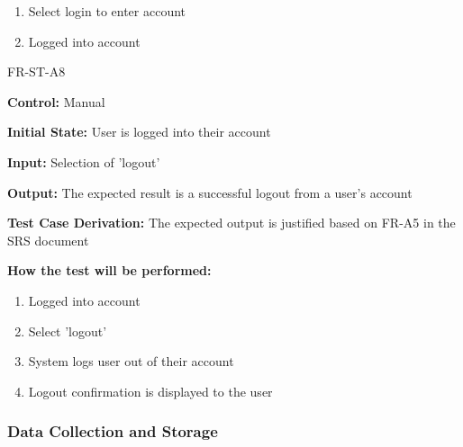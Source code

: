 \documentclass[12pt, titlepage]{article}
\begin{document}
\begin{itemize}
\begin{item}
\begin{mdframed}[linewidth=0.5mm]
\begin{enumerate}[noitemsep]
      \item Select login to enter account
      \item Logged into account
    \end{enumerate}
\end{mdframed}
\end{item}
\begin{item}
  FR-ST-A8
  \begin{mdframed}[linewidth=0.5mm]
    \textbf{Control:} Manual \par
    \textbf{Initial State:} User is logged into their account \par
    \textbf{Input:} Selection of 'logout' \par
    \textbf{Output:} The expected result is a successful logout from a user's account \par
    \textbf{Test Case Derivation:} The expected output is justified based on FR-A5 in the SRS document \par
    \textbf{How the test will be performed:}
    \begin{enumerate}[noitemsep]
      \item Logged into account
      \item Select 'logout'
      \item System logs user out of their account
      \item Logout confirmation is displayed to the user
    \end{enumerate}
\end{mdframed}
\end{item}
\end{itemize}

\subsubsection{Data Collection and Storage}
\end{document}
